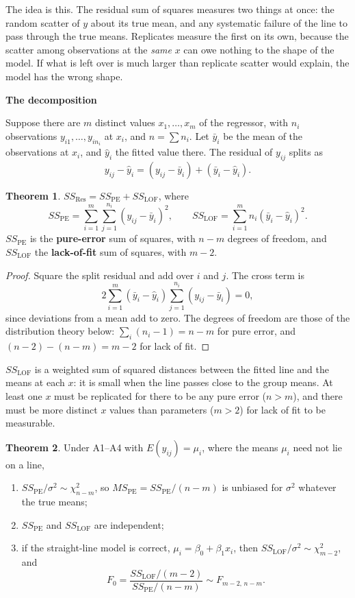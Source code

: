 \documentclass[11pt,a4paper]{article}
\numberwithin{equation}{section}
\theoremstyle{definition}
\newtheorem{thm}{Theorem}[subsection]
\newcommand{\subhead}[1]{%
  \par\medskip\noindent\textbf{#1}\par\nobreak\smallskip}
\begin{document}
The idea is this. The residual sum of squares measures two things at once: the random
scatter of $y$ about its true mean, and any systematic failure of the line to pass through
the true means. Replicates measure the first on its own, because the scatter among
observations at the \emph{same} $x$ can owe nothing to the shape of the model. If what is
left over is much larger than replicate scatter would explain, the model has the wrong
shape.

\subhead{The decomposition}
Suppose there are $m$ distinct values $x_1, \dots, x_m$ of the regressor, with $n_i$
observations $y_{i1}, \dots, y_{in_i}$ at $x_i$, and $n = \sum n_i$. Let $\bar y_i$ be the
mean of the observations at $x_i$, and $\hat y_i$ the fitted value there. The residual of
$y_{ij}$ splits as
\[
y_{ij} - \hat y_i = (y_{ij} - \bar y_i) + (\bar y_i - \hat y_i) .
\]

\begin{thm}\label{thm:lof-identity}
$SS_{\mathrm{Res}} = SS_{\mathrm{PE}} + SS_{\mathrm{LOF}}$, where
\[
SS_{\mathrm{PE}} = \sum_{i=1}^m \sum_{j=1}^{n_i}(y_{ij} - \bar y_i)^2 ,
\qquad
SS_{\mathrm{LOF}} = \sum_{i=1}^m n_i(\bar y_i - \hat y_i)^2 .
\]
$SS_{\mathrm{PE}}$ is the \textbf{pure-error} sum of squares, with $n - m$ degrees of
freedom, and $SS_{\mathrm{LOF}}$ the \textbf{lack-of-fit} sum of squares, with $m - 2$.
\end{thm}

\begin{proof}
Square the split residual and add over $i$ and $j$. The cross term is
\[
2\sum_{i=1}^m (\bar y_i - \hat y_i)\sum_{j=1}^{n_i}(y_{ij} - \bar y_i) = 0 ,
\]
since deviations from a mean add to zero. The degrees of freedom are those of the
distribution theory below: $\sum_i (n_i - 1) = n - m$ for pure error, and
$(n - 2) - (n - m) = m - 2$ for lack of fit.
\end{proof}

$SS_{\mathrm{LOF}}$ is a weighted sum of squared distances between the fitted line and the
means at each $x$: it is small when the line passes close to the group means. At least one
$x$ must be replicated for there to be any pure error ($n > m$), and there must be more
distinct $x$ values than parameters ($m > 2$) for lack of fit to be measurable.

\begin{thm}\label{thm:lof-test}
Under A1--A4 with $E(y_{ij}) = \mu_i$, where the means $\mu_i$ need not lie on a line,
\begin{enumerate}[label=(\roman*)]
\item $SS_{\mathrm{PE}}/\sigma^2 \sim \chi^2_{n - m}$, so $MS_{\mathrm{PE}} = SS_{\mathrm{PE}}/(n - m)$
is unbiased for $\sigma^2$ whatever the true means;
\item $SS_{\mathrm{PE}}$ and $SS_{\mathrm{LOF}}$ are independent;
\item if the straight-line model is correct, $\mu_i = \beta_0 + \beta_1 x_i$, then
$SS_{\mathrm{LOF}}/\sigma^2 \sim \chi^2_{m - 2}$, and
\[
F_0 = \frac{SS_{\mathrm{LOF}}/(m - 2)}{SS_{\mathrm{PE}}/(n - m)} \sim F_{m - 2,\, n - m} .
\]
\end{enumerate}
\end{thm}
\end{document}
